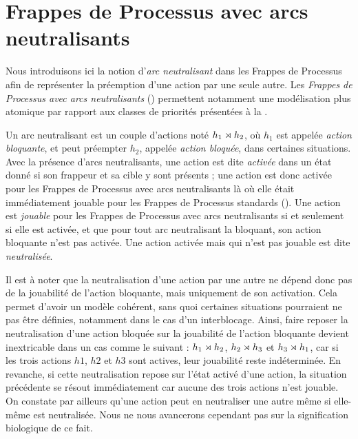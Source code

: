 \section{Frappes de Processus avec arcs neutralisants}

Nous introduisons ici la notion d'\emph{arc neutralisant} dans les Frappes de Processus
afin de représenter la préemption d'une action par une seule autre.
Les \emph{Frappes de Processus avec arcs neutralisants} ()
permettent notamment une modélisation plus atomique
par rapport aux classes de priorités présentées à la .

Un arc neutralisant est un couple d'actions noté $h_1\rtimes h_2$,
où $h_1$ est appelée \emph{action bloquante},
et peut préempter $h_2$, appelée \emph{action bloquée},
dans certaines situations.
Avec la présence d'arcs neutralisants, une action est dite \emph{activée} dans un état donné si
son frappeur et sa cible y sont présents ;
une action est donc activée pour les Frappes de Processus avec arcs neutralisants
là où elle était immédiatement jouable pour les Frappes de Processus standards ().
Une action est \emph{jouable} pour les Frappes de Processus avec arcs neutralisants
si et seulement si elle est activée,
et que pour tout arc neutralisant la bloquant, son action bloquante n'est pas activée.
Une action activée mais qui n'est pas jouable est dite \emph{neutralisée}.

Il est à noter que la neutralisation d'une action par une autre ne dépend donc pas de la jouabilité
de l'action bloquante, mais uniquement de son activation.
Cela permet d'avoir un modèle cohérent, sans quoi certaines situations pourraient ne pas être
définies, notamment dans le cas d'un interblocage.
Ainsi, faire reposer la neutralisation d'une action bloquée sur la jouabilité de l'action bloquante
devient inextricable dans un cas comme le suivant :
$h_1\rtimes h_2$, $h_2\rtimes h_3$ et $h_3\rtimes h_1$,
car si les trois actions $h1$, $h2$ et $h3$ sont actives, leur jouabilité reste indéterminée.
En revanche, si cette neutralisation repose sur l'état activé d'une action,
la situation précédente se résout immédiatement car aucune des trois actions n'est jouable.
On constate par ailleurs qu'une action peut en neutraliser une autre
même si elle-même est neutralisée.
Nous ne nous avancerons cependant pas sur la signification biologique de ce fait.


